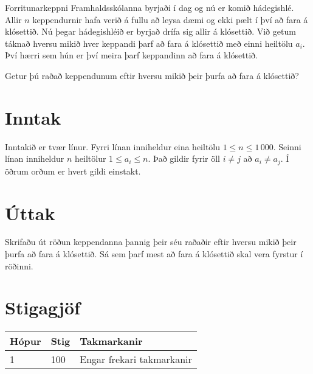 Forritunarkeppni Framhaldsskólanna byrjaði í dag og nú er komið hádegishlé.
Allir $n$ keppendurnir hafa verið á fullu að leysa dæmi og ekki pælt í því að fara á klósettið.
Nú þegar hádegishléið er byrjað drífa sig allir á klósettið.
Við getum táknað hversu mikið hver keppandi þarf að fara á klósettið með einni heiltölu $a_i$.
Því hærri sem hún er því meira þarf keppandinn að fara á klósettið.

Getur þú raðað keppendunum eftir hversu mikið þeir þurfa að fara á klósettið?

\section*{Inntak}
Inntakið er tvær línur. Fyrri línan inniheldur eina heiltölu $1 \le n \le 1\,000$.
Seinni línan inniheldur $n$ heiltölur $1 \le a_i \le n$.
Það gildir fyrir öll $i \neq j$ að $a_i \neq a_j$.
Í öðrum orðum er hvert gildi einstakt.

\section*{Úttak}
Skrifaðu út röðun keppendanna þannig þeir séu raðaðir eftir hversu mikið þeir þurfa að fara á klósettið.
Sá sem þarf mest að fara á klósettið skal vera fyrstur í röðinni.

\section*{Stigagjöf}
\begin{tabular}{|l|l|l|}
\hline
Hópur & Stig & Takmarkanir \\ \hline
1     & 100  & Engar frekari takmarkanir \\ \hline
\end{tabular}
